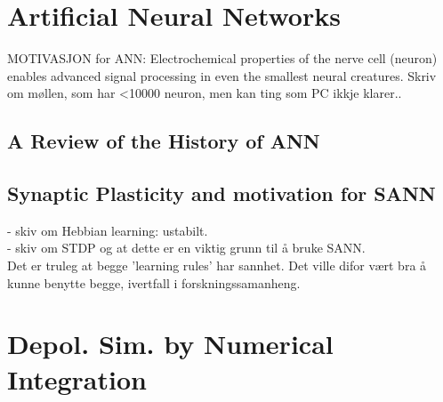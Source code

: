 
\section{Artificial Neural Networks}

	MOTIVASJON for ANN: Electrochemical properties of the nerve cell (neuron) enables advanced signal processing in even the smallest neural creatures. Skriv om møllen, som har <10000 neuron, men kan ting som PC ikkje klarer..

	\subsection{A Review of the History of ANN}
	\subsection{Synaptic Plasticity and motivation for SANN}
		- skiv om Hebbian learning: ustabilt. \\
		- skiv om STDP og at dette er en viktig grunn til å bruke SANN. \\
		Det er truleg at begge 'learning rules' har sannhet. Det ville difor vært bra å kunne benytte begge, ivertfall i forskningssamanheng.

\section{Depol. Sim. by Numerical Integration}
		

